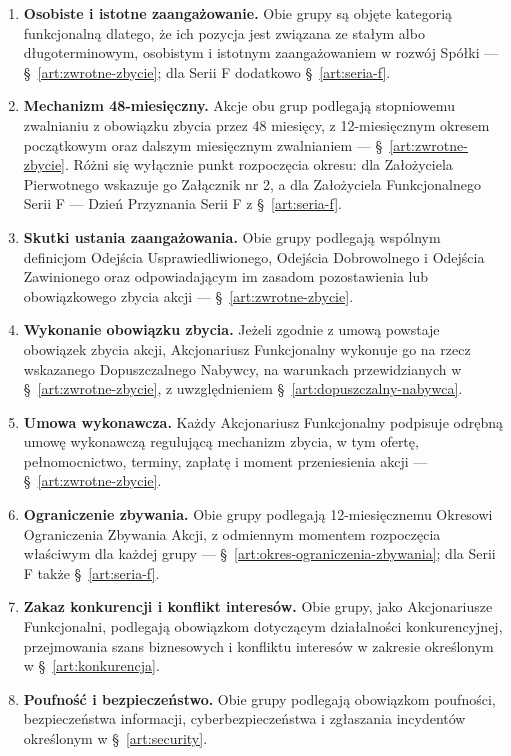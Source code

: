 \documentclass[12pt,a4paper]{report}
\begin{document}
\begin{enumerate}
  \item \textbf{Osobiste i istotne zaangażowanie.} Obie grupy są objęte kategorią funkcjonalną dlatego, że ich pozycja jest związana ze stałym albo długoterminowym, osobistym i istotnym zaangażowaniem w rozwój Spółki --- §~\ref{art:zwrotne-zbycie}; dla Serii F dodatkowo §~\ref{art:seria-f}.
  \item \textbf{Mechanizm 48-miesięczny.} Akcje obu grup podlegają stopniowemu zwalnianiu z obowiązku zbycia przez 48 miesięcy, z 12-miesięcznym okresem początkowym oraz dalszym miesięcznym zwalnianiem --- §~\ref{art:zwrotne-zbycie}. Różni się wyłącznie punkt rozpoczęcia okresu: dla Założyciela Pierwotnego wskazuje go Załącznik nr 2, a dla Założyciela Funkcjonalnego Serii F --- Dzień Przyznania Serii F z §~\ref{art:seria-f}.
  \item \textbf{Skutki ustania zaangażowania.} Obie grupy podlegają wspólnym definicjom Odejścia Usprawiedliwionego, Odejścia Dobrowolnego i Odejścia Zawinionego oraz odpowiadającym im zasadom pozostawienia lub obowiązkowego zbycia akcji --- §~\ref{art:zwrotne-zbycie}.
  \item \textbf{Wykonanie obowiązku zbycia.} Jeżeli zgodnie z umową powstaje obowiązek zbycia akcji, Akcjonariusz Funkcjonalny wykonuje go na rzecz wskazanego Dopuszczalnego Nabywcy, na warunkach przewidzianych w §~\ref{art:zwrotne-zbycie}, z uwzględnieniem §~\ref{art:dopuszczalny-nabywca}.
  \item \textbf{Umowa wykonawcza.} Każdy Akcjonariusz Funkcjonalny podpisuje odrębną umowę wykonawczą regulującą mechanizm zbycia, w tym ofertę, pełnomocnictwo, terminy, zapłatę i moment przeniesienia akcji --- §~\ref{art:zwrotne-zbycie}.
  \item \textbf{Ograniczenie zbywania.} Obie grupy podlegają 12-miesięcznemu Okresowi Ograniczenia Zbywania Akcji, z odmiennym momentem rozpoczęcia właściwym dla każdej grupy --- §~\ref{art:okres-ograniczenia-zbywania}; dla Serii F także §~\ref{art:seria-f}.
  \item \textbf{Zakaz konkurencji i konflikt interesów.} Obie grupy, jako Akcjonariusze Funkcjonalni, podlegają obowiązkom dotyczącym działalności konkurencyjnej, przejmowania szans biznesowych i konfliktu interesów w zakresie określonym w §~\ref{art:konkurencja}.
  \item \textbf{Poufność i bezpieczeństwo.} Obie grupy podlegają obowiązkom poufności, bezpieczeństwa informacji, cyberbezpieczeństwa i zgłaszania incydentów określonym w §~\ref{art:security}.

\end{enumerate}
\end{document}
